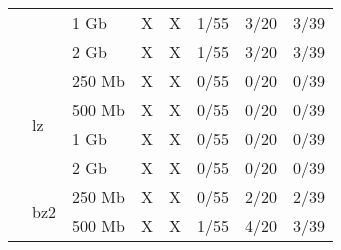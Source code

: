 \documentclass{article}           %
\begin{document}
\begin{table}[]
\begin{tabular}{lllccccc}
\multicolumn{1}{|l|}{}                               & \multicolumn{1}{l|}{}                     & \multicolumn{1}{l|}{1 Gb}   & \multicolumn{1}{c|}{\textsf{X}}       & \multicolumn{1}{c|}{\textsf{X}}       & \multicolumn{1}{c|}{1/55}           & \multicolumn{1}{c|}{3/20}      & \multicolumn{1}{c|}{3/39}        \\ \cline{3-8} 
\multicolumn{1}{|l|}{}                               & \multicolumn{1}{l|}{}                     & \multicolumn{1}{l|}{2 Gb}   & \multicolumn{1}{c|}{\textsf{X}}       & \multicolumn{1}{c|}{\textsf{X}}       & \multicolumn{1}{c|}{1/55}           & \multicolumn{1}{c|}{3/20}      & \multicolumn{1}{c|}{3/39}        \\ \cline{2-8} 
\multicolumn{1}{|l|}{}                               & \multicolumn{1}{l|}{\multirow{4}{*}{lz}}  & \multicolumn{1}{l|}{250 Mb} & \multicolumn{1}{c|}{\textsf{X}}       & \multicolumn{1}{c|}{\textsf{X}}       & \multicolumn{1}{c|}{0/55}           & \multicolumn{1}{c|}{0/20}      & \multicolumn{1}{c|}{0/39}        \\ \cline{3-8} 
\multicolumn{1}{|l|}{}                               & \multicolumn{1}{l|}{}                     & \multicolumn{1}{l|}{500 Mb} & \multicolumn{1}{c|}{\textsf{X}}       & \multicolumn{1}{c|}{\textsf{X}}       & \multicolumn{1}{c|}{0/55}           & \multicolumn{1}{c|}{0/20}      & \multicolumn{1}{c|}{0/39}        \\ \cline{3-8} 
\multicolumn{1}{|l|}{}                               & \multicolumn{1}{l|}{}                     & \multicolumn{1}{l|}{1 Gb}   & \multicolumn{1}{c|}{\textsf{X}}       & \multicolumn{1}{c|}{\textsf{X}}       & \multicolumn{1}{c|}{0/55}           & \multicolumn{1}{c|}{0/20}      & \multicolumn{1}{c|}{0/39}        \\ \cline{3-8} 
\multicolumn{1}{|l|}{}                               & \multicolumn{1}{l|}{}                     & \multicolumn{1}{l|}{2 Gb}   & \multicolumn{1}{c|}{\textsf{X}}       & \multicolumn{1}{c|}{\textsf{X}}       & \multicolumn{1}{c|}{0/55}           & \multicolumn{1}{c|}{0/20}      & \multicolumn{1}{c|}{0/39}        \\ \cline{2-8} 
\multicolumn{1}{|l|}{}                               & \multicolumn{1}{l|}{\multirow{4}{*}{bz2}} & \multicolumn{1}{l|}{250 Mb} & \multicolumn{1}{c|}{\textsf{X}}       & \multicolumn{1}{c|}{\textsf{X}}       & \multicolumn{1}{c|}{0/55}           & \multicolumn{1}{c|}{2/20}      & \multicolumn{1}{c|}{2/39}        \\ \cline{3-8} 
\multicolumn{1}{|l|}{}                               & \multicolumn{1}{l|}{}                     & \multicolumn{1}{l|}{500 Mb} & \multicolumn{1}{c|}{\textsf{X}}       & \multicolumn{1}{c|}{\textsf{X}}       & \multicolumn{1}{c|}{1/55}           & \multicolumn{1}{c|}{4/20}      & \multicolumn{1}{c|}{3/39}        \\ \cline{3-8} 

\end{tabular}
\end{table}
\end{document}
